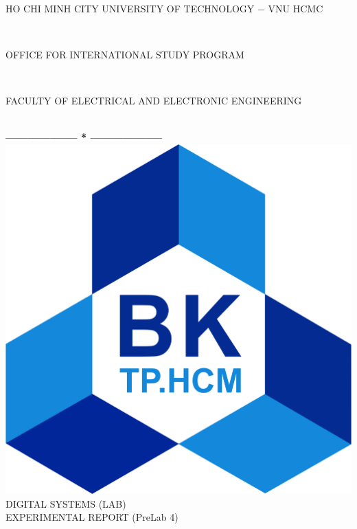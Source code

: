 \documentclass[13pt,a4paper]{report}
\begin{document}
\fontsize{13pt}{18pt}\selectfont
\begin{titlepage}
\thispagestyle{empty}
\thisfancypage{%
\setlength{\fboxsep}{0pt}%
\fbox}{} %
\

\begin{center}
\begin{large}
HO CHI MINH CITY UNIVERSITY OF TECHNOLOGY $-$ VNU HCMC
\end{large} \\
\begin{large}
OFFICE FOR INTERNATIONAL STUDY PROGRAM
\end{large} \\
\begin{large}
FACULTY OF ELECTRICAL AND ELECTRONIC ENGINEERING
\end{large} \\
\textbf{--------------------  *  --------------------}\\[4cm]
\includegraphics[scale=0.1]{logobk.png}\\[1cm]
{\fontsize{20pt}{1}\selectfont DIGITAL SYSTEMS (LAB)}\\
{\fontsize{20pt}{1}\selectfont EXPERIMENTAL REPORT (PreLab 4)}\\[2.5cm]
\end{center}


\end{titlepage}
\end{document}
